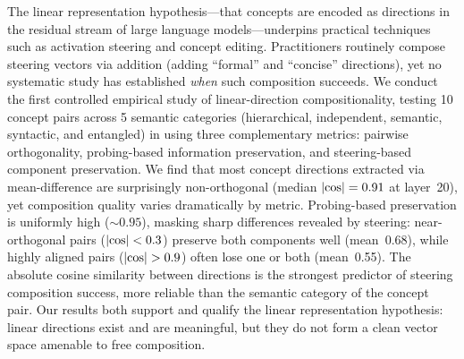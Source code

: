 The linear representation hypothesis---that concepts are encoded as directions in
the residual stream of large language models---underpins practical techniques such
as activation steering and concept editing. Practitioners routinely compose
steering vectors via addition (\eg adding ``formal'' and ``concise'' directions),
yet no systematic study has established \emph{when} such composition succeeds.
We conduct the first controlled empirical study of linear-direction
compositionality, testing 10 concept pairs across 5 semantic categories
(hierarchical, independent, semantic, syntactic, and entangled) in
\pythia using three complementary metrics: pairwise orthogonality,
probing-based information preservation, and steering-based component
preservation. We find that most concept directions extracted via
mean-difference are surprisingly non-orthogonal (median $|\text{cos}| = 0.91$ at
layer~20), yet composition quality varies dramatically by metric.
Probing-based preservation is uniformly high (${\sim}0.95$), masking sharp
differences revealed by steering: near-orthogonal pairs ($|\text{cos}| < 0.3$)
preserve both components well (mean~0.68), while highly aligned pairs
($|\text{cos}| > 0.9$) often lose one or both (mean~0.55). The absolute cosine
similarity between directions is the strongest predictor of steering
composition success, more reliable than the semantic category of the concept
pair. Our results both support and qualify the linear representation
hypothesis: linear directions exist and are meaningful, but they do not form
a clean vector space amenable to free composition.
